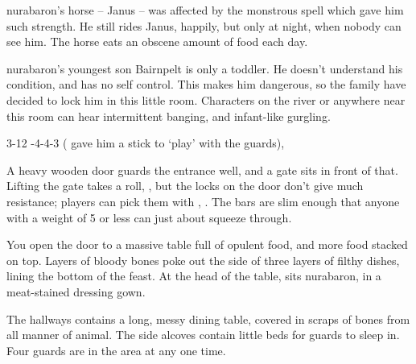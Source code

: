 \begin{multicols}{2}
\Gls{nurabaron}'s horse -- Janus -- was affected by the monstrous spell which gave him such strength.
He still rides Janus, happily, but only at night, when nobody can see him.
The horse eats an obscene amount of food each day.


\Gls{nurabaron}'s youngest son Bairnpelt is only a toddler.
He doesn't understand his condition, and has no self control.
This makes him dangerous, so the family have decided to lock him in this little room.
Characters on the river or anywhere near this room can hear intermittent banging, and infant-like gurgling.

%
  {{3}{-1}{2}}%
  {{-4}{-4}{-3}}%
  {%
    \quarterstaff
  }%
  {}%
  {( gave him a stick to `play' with the guards), \lootGoblin}%
  {}%




A heavy wooden door guards the entrance well, and a gate sits in front of that.
Lifting the gate takes a  roll, \tn[10], but the locks on the door don't give much resistance; players can pick them with , \tn[8].
The bars are slim enough that anyone with a \gls{weight} of 5 or less can just about squeeze through.

\begin{boxtext}
  You open the door to a massive table full of opulent food, and more food stacked on top.
  Layers of bloody bones poke out the side of three layers of filthy dishes, lining the bottom of the feast.
  At the head of the table, sits \gls{nurabaron}, in a meat-stained dressing gown.
\end{boxtext}

The hallways contains a long, messy dining table, covered in scraps of bones from all manner of animal.
The side alcoves contain little beds for guards to sleep in.  Four guards are in the area at any one time.


\end{multicols}
